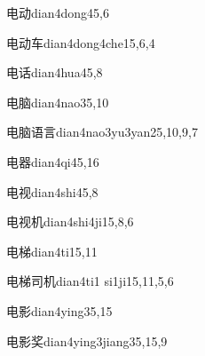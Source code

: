 \begin{entry}{电动}{dian4dong4}{5,6}
\end{entry}

\begin{entry}{电动车}{dian4dong4che1}{5,6,4}
\end{entry}

\begin{entry}{电话}{dian4hua4}{5,8}
\end{entry}

\begin{entry}{电脑}{dian4nao3}{5,10}
\end{entry}

\begin{entry}{电脑语言}{dian4nao3yu3yan2}{5,10,9,7}
\end{entry}

\begin{entry}{电器}{dian4qi4}{5,16}
\end{entry}

\begin{entry}{电视}{dian4shi4}{5,8}
\end{entry}

\begin{entry}{电视机}{dian4shi4ji1}{5,8,6}
\end{entry}

\begin{entry}{电梯}{dian4ti1}{5,11}
\end{entry}

\begin{entry}{电梯司机}{dian4ti1 si1ji1}{5,11,5,6}
\end{entry}

\begin{entry}{电影}{dian4ying3}{5,15}
\end{entry}

\begin{entry}{电影奖}{dian4ying3jiang3}{5,15,9}
\end{entry}

